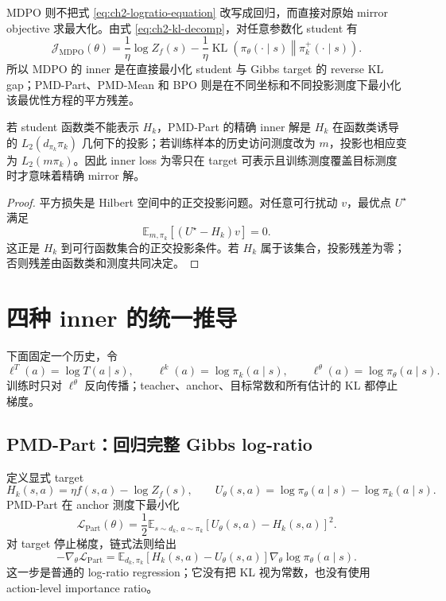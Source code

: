 MDPO 则不把式 \eqref{eq:ch2-logratio-equation} 改写成回归，而直接对原始 mirror objective 求最大化。由式 \eqref{eq:ch2-kl-decomp}，对任意参数化 student 有
\begin{equation}
\label{eq:ch2-mdpo-kl-gap}
\mathcal J_{\mathrm{MDPO}}(\theta)
=\frac1\eta\log Z_f(s)
-\frac1\eta\operatorname{KL}\!\left(\pi_\theta(\cdot\mid s)\middle\Vert\pi_k^+(\cdot\mid s)\right).
\end{equation}
所以 MDPO 的 inner 是在直接最小化 student 与 Gibbs target 的 reverse KL gap；PMD-Part、PMD-Mean 和 BPO 则是在不同坐标和不同投影测度下最小化该最优性方程的平方残差。

\begin{proposition}[平方回归的投影含义]
\label{prop:ch2-regression-projection}
若 student 函数类不能表示 $H_k$，PMD-Part 的精确 inner 解是 $H_k$ 在函数类诱导的 $L_2(d_{\pi_k}\pi_k)$ 几何下的投影；若训练样本的历史访问测度改为 $m$，投影也相应变为 $L_2(m\pi_k)$。因此 inner loss 为零只在 target 可表示且训练测度覆盖目标测度时才意味着精确 mirror 解。
\end{proposition}

\begin{proof}
平方损失是 Hilbert 空间中的正交投影问题。对任意可行扰动 $v$，最优点 $U^\star$ 满足
\[
\mathbb E_{m,\pi_k}[(U^\star-H_k)v]=0.
\]
这正是 $H_k$ 到可行函数集合的正交投影条件。若 $H_k$ 属于该集合，投影残差为零；否则残差由函数类和测度共同决定。
\end{proof}

\section{四种 inner 的统一推导}
\label{sec:ch2-four-methods}

下面固定一个历史，令
\[
\ell^T(a)=\log T(a\mid s),\qquad
\ell^k(a)=\log\pi_k(a\mid s),\qquad
\ell^\theta(a)=\log\pi_\theta(a\mid s).
\]
训练时只对 $\ell^\theta$ 反向传播；teacher、anchor、目标常数和所有估计的 KL 都停止梯度。

\subsection{PMD-Part：回归完整 Gibbs log-ratio}
\label{sec:ch2-pmd-part}

定义显式 target
\[
H_k(s,a)=\eta f(s,a)-\log Z_f(s),
\qquad
U_\theta(s,a)=\log\pi_\theta(a\mid s)-\log\pi_k(a\mid s).
\]
PMD-Part 在 anchor 测度下最小化
\begin{equation}
\label{eq:ch2-part-loss}
\mathcal L_{\mathrm{Part}}(\theta)
=\frac12\mathbb E_{s\sim d_k,\,a\sim\pi_k}
\left[U_\theta(s,a)-H_k(s,a)\right]^2.
\end{equation}
对 target 停止梯度，链式法则给出
\begin{equation}
\label{eq:ch2-part-gradient}
-\nabla_\theta\mathcal L_{\mathrm{Part}}
=\mathbb E_{d_k,\pi_k}
\left[H_k(s,a)-U_\theta(s,a)\right]
\nabla_\theta\log\pi_\theta(a\mid s).
\end{equation}
这一步是普通的 log-ratio regression；它没有把 KL 视为常数，也没有使用 action-level importance ratio。

